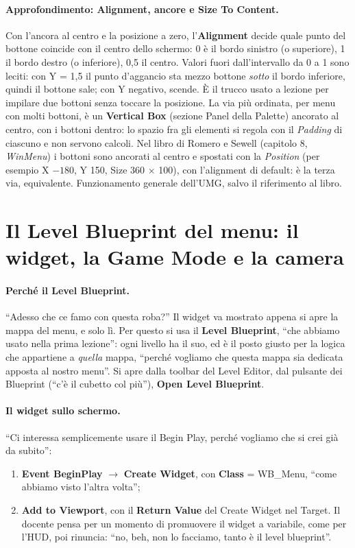 \paragraph{Approfondimento: Alignment, ancore e Size To Content.} Con l'ancora al centro e
la posizione a zero, l'\textbf{Alignment} decide quale punto del bottone coincide con il
centro dello schermo: 0 è il bordo sinistro (o superiore), 1 il bordo destro (o inferiore),
0,5 il centro. Valori fuori dall'intervallo da 0 a 1 sono leciti: con Y = 1,5 il punto
d'aggancio sta mezzo bottone \emph{sotto} il bordo inferiore, quindi il bottone sale; con Y
negativo, scende. È il trucco usato a lezione per impilare due bottoni senza toccare la
posizione. La via più ordinata, per menu con molti bottoni, è un \textbf{Vertical Box}
(sezione Panel della Palette) ancorato al centro, con i bottoni dentro: lo spazio fra gli
elementi si regola con il \emph{Padding} di ciascuno e non servono calcoli. Nel libro di
Romero e Sewell (capitolo 8, \emph{WinMenu}) i bottoni sono ancorati al centro e spostati
con la \emph{Position} (per esempio X $-180$, Y 150, Size 360 $\times$ 100), con l'alignment
di default: è la terza via, equivalente. Funzionamento generale dell'UMG, salvo il
riferimento al libro.

\section{Il Level Blueprint del menu: il widget, la Game Mode e la camera}
\label{ue12:sec:levelbp}

\paragraph{Perché il Level Blueprint.} ``Adesso che ce famo con questa roba?'' Il widget
va mostrato appena si apre la mappa del menu, e solo lì. Per questo si usa il
\textbf{Level Blueprint}, ``che abbiamo usato nella prima lezione'': ogni livello ha il
suo, ed è il posto giusto per la logica che appartiene a \emph{quella} mappa, ``perché
vogliamo che questa mappa sia dedicata apposta al nostro menu''. Si apre dalla toolbar
del Level Editor, dal pulsante dei Blueprint (``c'è il cubetto col più''),
\textbf{Open Level Blueprint}.

\paragraph{Il widget sullo schermo.} ``Ci interessa semplicemente usare il Begin Play,
perché vogliamo che si crei già da subito'':
\begin{enumerate}
  \item \textbf{Event BeginPlay} $\rightarrow$ \textbf{Create Widget}, con
        \textbf{Class} = WB\_Menu, ``come abbiamo visto l'altra volta'';
  \item \textbf{Add to Viewport}, con il \textbf{Return Value} del Create Widget nel
        Target. Il docente pensa per un momento di promuovere il widget a variabile, come
        per l'HUD, poi rinuncia: ``no, beh, non lo facciamo, tanto è il level blueprint''.
\end{enumerate}


